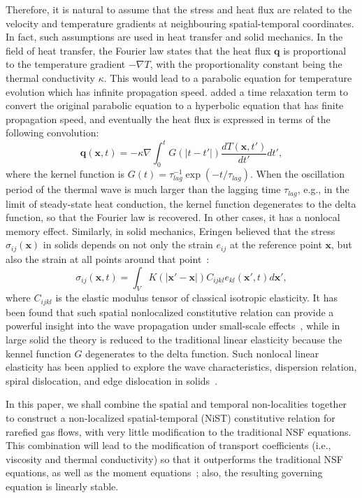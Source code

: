 \documentclass[lineno]{jfm}
\begin{document}
Therefore, it is natural to assume that the stress and heat flux are related to the velocity and temperature gradients at neighbouring spatial-temporal coordinates. In fact, such assumptions are used in heat transfer and solid mechanics.
In the field of heat transfer, the Fourier law states that the heat flux $\bm q$ is proportional to the temperature gradient $-\nabla T$, with the proportionality constant being the thermal conductivity $\kappa$. This would lead to a parabolic equation for temperature evolution which has infinite propagation speed. \cite{cite4} added a time relaxation term to convert the original parabolic equation to a hyperbolic equation that has finite propagation speed, and eventually the heat flux is expressed in terms of the following convolution:
\begin{equation}
	\bm q(\bm x,t) = -\kappa \nabla \int_0^t G(|t-t'|) \frac{d T(\bm x,t')}{d t'} dt',
\end{equation}
where the kernel function is $G(t) = \tau_{lag}^{-1} \exp(-t/\tau_{lag})$. When the oscillation period of the thermal wave is much larger than the lagging time $\tau_{lag}$, e.g., in the limit of steady-state heat conduction, the kernel function degenerates to the delta function, so that the Fourier law is recovered. In other cases, it has a nonlocal memory effect. Similarly, in solid mechanics, Eringen believed that the stress $\sigma_{ij}(\boldsymbol{x})$ in solids depends on not only the strain $e_{ij}$ at the reference point $\boldsymbol{x}$, but also the strain at all points around that point~\citep{Eringen1976,cite1}:
\begin{equation}\label{eq5}
	\sigma_{ij}(\boldsymbol{x},t) = \int_V K(|\boldsymbol{x'}-\boldsymbol{x}|)C_{ijkl}e_{kl}(\boldsymbol{x'},t)d\boldsymbol{x'},
\end{equation}
where $C_{ijkl}$ is the elastic modulus tensor of classical isotropic elasticity. 
It has been found that such spatial nonlocalized constitutive relation can provide a powerful insight into the wave propagation under small-scale effects~\citep{cite2}, while in large solid the theory is reduced to the traditional linear elasticity because the kennel function $G$ degenerates to the delta function.
Such nonlocal linear elasticity has  been applied to explore the wave characteristics, dispersion relation, spiral dislocation, and edge dislocation in solids~\citep{cite1,cite11}.

In this paper, we shall combine the spatial and temporal non-localities together to construct a non-localized spatial-temporal (NiST) constitutive relation for rarefied gas flows, with very little modification to the traditional NSF equations. This combination will lead to the modification of transport coefficients (i.e., viscosity and thermal conductivity) so that it outperforms the traditional NSF equations, as well as the moment equations~\citep{cite8}; also, the resulting governing equation is linearly stable.
\end{document}
